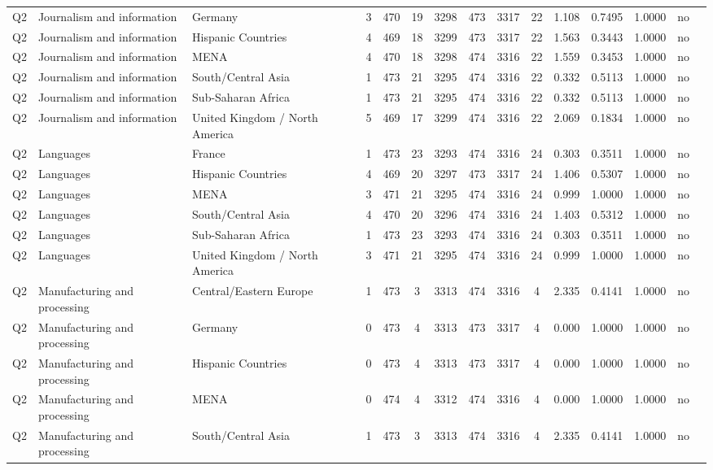 \begin{longtable}{lllrcccccccccll}
Q2 & Journalism and information & Germany & 3 & 470 & 19 & 3298 & 473 & 3317 & 22 & 1.108 & 0.7495 & 1.0000 & no \\
Q2 & Journalism and information & Hispanic Countries & 4 & 469 & 18 & 3299 & 473 & 3317 & 22 & 1.563 & 0.3443 & 1.0000 & no \\
Q2 & Journalism and information & MENA & 4 & 470 & 18 & 3298 & 474 & 3316 & 22 & 1.559 & 0.3453 & 1.0000 & no \\
Q2 & Journalism and information & South/Central Asia & 1 & 473 & 21 & 3295 & 474 & 3316 & 22 & 0.332 & 0.5113 & 1.0000 & no \\
Q2 & Journalism and information & Sub-Saharan Africa & 1 & 473 & 21 & 3295 & 474 & 3316 & 22 & 0.332 & 0.5113 & 1.0000 & no \\
Q2 & Journalism and information & United Kingdom / North America & 5 & 469 & 17 & 3299 & 474 & 3316 & 22 & 2.069 & 0.1834 & 1.0000 & no \\
Q2 & Languages & France & 1 & 473 & 23 & 3293 & 474 & 3316 & 24 & 0.303 & 0.3511 & 1.0000 & no \\
Q2 & Languages & Hispanic Countries & 4 & 469 & 20 & 3297 & 473 & 3317 & 24 & 1.406 & 0.5307 & 1.0000 & no \\
Q2 & Languages & MENA & 3 & 471 & 21 & 3295 & 474 & 3316 & 24 & 0.999 & 1.0000 & 1.0000 & no \\
Q2 & Languages & South/Central Asia & 4 & 470 & 20 & 3296 & 474 & 3316 & 24 & 1.403 & 0.5312 & 1.0000 & no \\
Q2 & Languages & Sub-Saharan Africa & 1 & 473 & 23 & 3293 & 474 & 3316 & 24 & 0.303 & 0.3511 & 1.0000 & no \\
Q2 & Languages & United Kingdom / North America & 3 & 471 & 21 & 3295 & 474 & 3316 & 24 & 0.999 & 1.0000 & 1.0000 & no \\
Q2 & Manufacturing and processing & Central/Eastern Europe & 1 & 473 & 3 & 3313 & 474 & 3316 & 4 & 2.335 & 0.4141 & 1.0000 & no \\
Q2 & Manufacturing and processing & Germany & 0 & 473 & 4 & 3313 & 473 & 3317 & 4 & 0.000 & 1.0000 & 1.0000 & no \\
Q2 & Manufacturing and processing & Hispanic Countries & 0 & 473 & 4 & 3313 & 473 & 3317 & 4 & 0.000 & 1.0000 & 1.0000 & no \\
Q2 & Manufacturing and processing & MENA & 0 & 474 & 4 & 3312 & 474 & 3316 & 4 & 0.000 & 1.0000 & 1.0000 & no \\
Q2 & Manufacturing and processing & South/Central Asia & 1 & 473 & 3 & 3313 & 474 & 3316 & 4 & 2.335 & 0.4141 & 1.0000 & no \\

\end{longtable}
